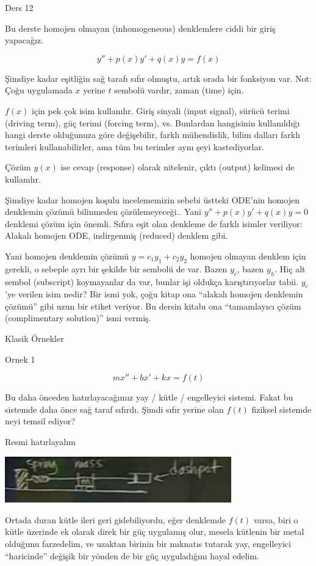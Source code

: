 \documentclass[12pt,fleqn]{article}\usepackage{../../common}
\begin{document}
Ders 12

Bu derste homojen olmayan (inhomogeneous) denklemlere ciddi bir giriş yapacağız.

$$ y'' + p(x)y' + q(x)y = f(x) $$

Şimdiye kadar eşitliğin sağ tarafı sıfır olmuştu, artık orada bir fonksiyon
var. Not: Çoğu uygulamada $x$ yerine $t$ sembolü vardır, zaman (time) için.

$f(x)$ için pek çok isim kullanılır. Giriş sinyali (input signal), sürücü terimi
(driving term), güç terimi (forcing term), vs. Bunlardan hangisinin kullanıldığı
hangi derste olduğunuza göre değişebilir, farklı mühendislik, bilim dalları
farklı terimleri kullanabilirler, ama tüm bu terimler aynı şeyi kastediyorlar.

Çözüm $y(x)$ ise cevap (response) olarak nitelenir, çıktı (output) kelimesi de
kullanılır.

Şimdiye kadar homojen koşulu incelememizin sebebi üstteki ODE'nin homojen
denklemin çözümü bilinmeden çözülemeyeceği.. Yani $y'' + p(x)y' + q(x)y = 0$
denklemi çözüm için önemli. Sıfıra eşit olan denkleme de farklı isimler
veriliyor: Alakalı homojen ODE, indirgenmiş (reduced) denklem gibi.

Yani homojen denklemin çözümü $y = c_1y_1 + c_2y_2$ homojen olmayan denklem için
gerekli, o sebeple ayrı bir şekilde bir sembolü de var. Bazen $y_c$, bazen
$y_h$. Hiç alt sembol (subscript) koymayanlar da var, bunlar işi oldukça
karıştırıyorlar tabii. $y_c$'ye verilen isim nedir? Bir ismi yok, çoğu kitap ona
``alakalı homojen denklemin çözümü'' gibi uzun bir etiket veriyor. Bu dersin
kitabı ona ``tamamlayıcı çözüm (complimentary solution)'' ismi vermiş.

Klasik Örnekler

Ornek 1

$$ mx'' + bx' + kx = f(t) $$

Bu daha önceden hatırlayacağımız yay / kütle / engelleyici sistemi. Fakat bu
sistemde daha önce sağ taraf sıfırdı. Şimdi sıfır yerine olan $f(t)$ fiziksel
sistemde neyi temsil ediyor?

Resmi hatırlayalım

\includegraphics[height=2cm]{12_1.png}

Ortada duran kütle ileri geri gidebiliyordu, eğer denklemde $f(t)$ varsa, biri o
kütle üzerinde ek olarak direk bir güç uygulamış olur, mesela kütlenin bir metal
olduğunu farzedelim, ve uzaktan birinin bir mıknatıs tutarak yay, engelleyici
``haricinde'' değişik bir yönden de bir güç uyguladığını hayal edelim.
\end{document}
